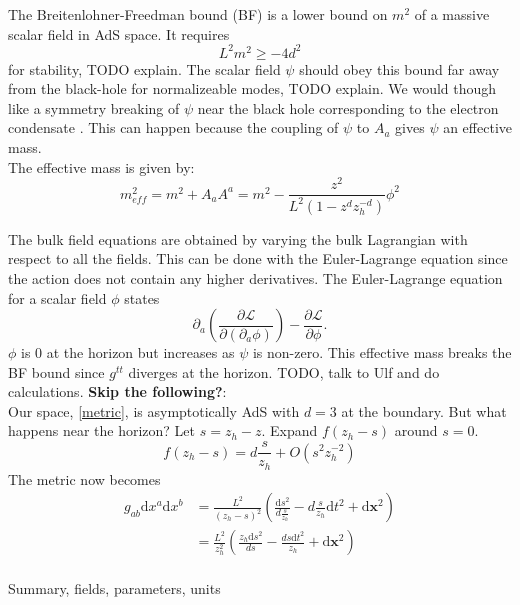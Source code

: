 \documentclass[12pt]{article}
\renewcommand{\d}{\ensuremath{\mathrm{d}}}
\begin{document}
The Breitenlohner-Freedman bound (BF) is a lower bound on $m^2$ of a massive scalar field in AdS space. It requires
\begin{equation}
 L^2m^2\geq-4d^2\label{BF}
\end{equation}
for stability\cite{Kleban:2004bv}, TODO explain. The scalar field $\psi$ should obey this bound far away from the black-hole for normalizeable modes, TODO explain. We would though like a symmetry breaking of $\psi$ near the black hole corresponding to the electron condensate \cite{Gubser:2008px}. This can happen because the coupling of $\psi$ to $A_a$ gives $\psi$ an effective mass. \\The effective mass is given by:
\begin{equation}
 m_{eff}^2=m^2+A_aA^a
=m^2-\frac{z^2}{L^2(1-z^dz_h^{-d})}\phi^2
\end{equation}

The bulk field equations are obtained by varying the bulk Lagrangian with respect to all the fields. This can be done with the Euler-Lagrange equation since the action does not contain any higher derivatives. The Euler-Lagrange equation for a scalar field $\phi$ states
\begin{equation}
 \partial_a\left(\frac{\partial\mathcal{L}}{\partial(\partial_a\phi)}\right)-\frac{\partial\mathcal{L}}{\partial\phi}.
\end{equation}
$\phi$ is 0 at the horizon but increases as $\psi$ is non-zero. This effective mass breaks the BF bound since $g^{tt}$ diverges at the horizon. TODO, talk to Ulf and do calculations.
{\bf Skip the following?}:\\
Our space, \eqref{metric}, is asymptotically AdS with $d=3$ at the boundary. But what happens near the horizon? Let $s=z_h-z$. Expand $f(z_h-s)$ around $s=0$.
\begin{equation}
 f(z_h-s)%
=d\frac{s}{z_h}+O(s^2z_h^{-2})
\end{equation}
The metric now becomes
\begin{equation}
\begin{split}
 g_{ab}\d x^a\d x^b&=\frac{L^2}{(z_h-s)^2}\left(\frac{\d s^2}{d\frac{s}{z_h}}-d\frac{s}{z_h}\d t^2+\d \mathbf{x}^2\right)\\
&=\frac{L^2}{z_h^2}\left(\frac{z_h\d s^2}{ds}-\frac{ds\d t^2}{z_h}+\d \mathbf{x}^2\right)
\end{split}
\end{equation}
\\
Summary, fields, parameters, units
\end{document}
